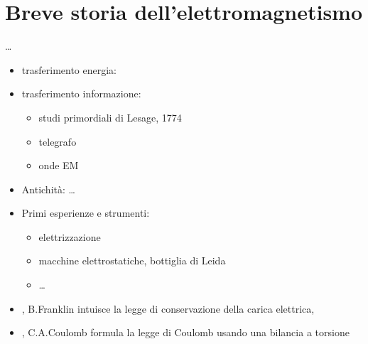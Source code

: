 \documentclass[letterpaper,10pt,italian]{jupyterBook}
\begin{document}
\sphinxstepscope


\section{Breve storia dell’elettromagnetismo}
\label{\detokenize{ch/electromagnetism/intro-history:breve-storia-dell-elettromagnetismo}}\label{\detokenize{ch/electromagnetism/intro-history:physics-hs-electromagnetism-intro-history}}\label{\detokenize{ch/electromagnetism/intro-history::doc}}
\sphinxAtStartPar
{}
…

\sphinxAtStartPar
{}
\begin{itemize}
\item {} 
\sphinxAtStartPar
trasferimento energia:

\item {} 
\sphinxAtStartPar
trasferimento informazione:
\begin{itemize}
\item {} 
\sphinxAtStartPar
studi primordiali di Lesage, 1774

\item {} 
\sphinxAtStartPar
telegrafo

\item {} 
\sphinxAtStartPar
onde EM

\end{itemize}

\item {} 
\sphinxAtStartPar
Antichità: …

\item {} 
\sphinxAtStartPar
Primi esperienze e strumenti:
\begin{itemize}
\item {} 
\sphinxAtStartPar
elettrizzazione

\item {} 
\sphinxAtStartPar
macchine elettrostatiche, bottiglia di Leida

\item {} 
\sphinxAtStartPar
…

\end{itemize}

\item {} 
, B.Franklin intuisce la legge di conservazione della carica elettrica, 

\item {} 
, C.A.Coulomb formula la legge di Coulomb usando una bilancia a torsione


\end{itemize}
\end{document}
